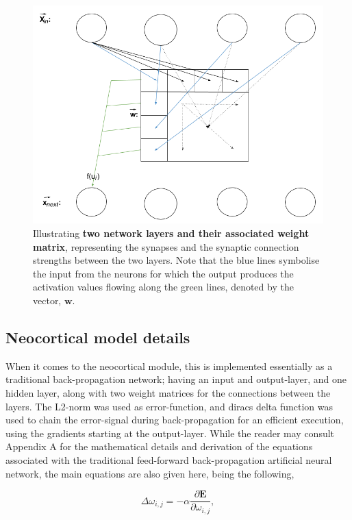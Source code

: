 \begin{figure}
    \centering
    \includegraphics[width=12cm]{fig/network_propagation}
    \caption{Illustrating \textbf{two network layers and their associated weight matrix}, representing the synapses and the synaptic connection strengths between the two layers. Note that the blue lines symbolise the input from the neurons for which the output produces the activation values flowing along the green lines, denoted by the vector, $\textbf{w}$.}
    \label{fig:network_layout}
\end{figure}


\subsection{Neocortical model details}

When it comes to the neocortical module, this is implemented essentially as a traditional back-propagation network; having an input and output-layer, and one hidden layer, along with two weight matrices for the connections between the layers. The L2-norm was used as error-function, and diracs delta function was used to chain the error-signal during back-propagation for an efficient execution, using the gradients starting at the output-layer. While the reader may consult Appendix A for the mathematical details and derivation of the equations associated with the traditional feed-forward back-propagation artificial neural network, the main equations are also given here, being the following,

\begin{equation}
    \Delta \omega_{i,j} = -\alpha \frac{\partial \textbf{E}}{\partial \omega_{i,j}},
\end{equation}

